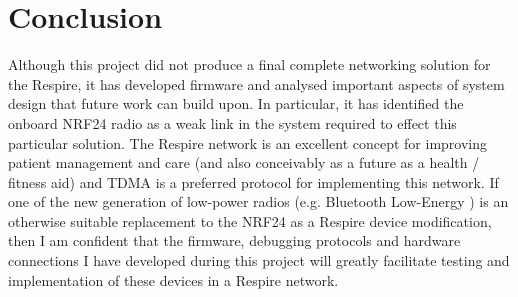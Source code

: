 
\chapter{Conclusion}

Although this project did not produce a final complete networking solution for the Respire, it has
developed firmware and analysed important aspects of system design that future work can build
upon. In particular, it has identified the onboard NRF24 radio as a weak link in the system required
to effect this particular solution. The Respire network is an excellent concept for improving patient
management and care (and also conceivably as a future as a health / fitness aid) and TDMA is a
preferred protocol for implementing this network. If one of the new generation of low-power radios
(e.g. Bluetooth Low-Energy ) is an otherwise suitable replacement to the NRF24 as a Respire device
modification, then I am confident that the firmware, debugging protocols and hardware connections
I have developed during this project will greatly facilitate testing and implementation of these
devices in a Respire network.


